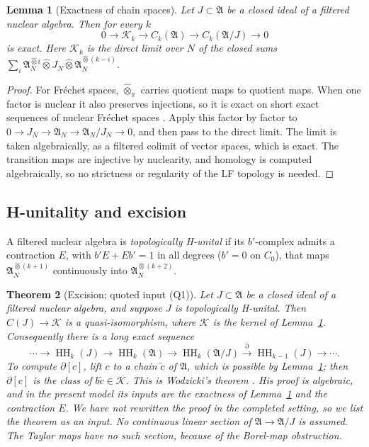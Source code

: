 \documentclass[11pt,oneside,reqno]{article}
\DeclareMathOperator{\HH}{HH}
\theoremstyle{plain}
\newtheorem{theorem}{Theorem}[section]
\newtheorem{lemma}[theorem]{Lemma}
\theoremstyle{definition}
\theoremstyle{remark}
\begin{document}
\begin{lemma}[Exactness of chain spaces]\label{lem:exactchains}
Let \(J\subset\mathfrak A\) be a closed ideal of a filtered nuclear algebra.
Then for every \(k\)
\[
 0\to\mathcal K_k\to C_k(\mathfrak A)\to C_k(\mathfrak A/J)\to0
\]
is exact. Here \(\mathcal K_k\) is the direct limit over \(N\) of the closed
sums \(\sum_i\mathfrak A_N^{\widehat\otimes i}\widehat\otimes J_N\widehat
\otimes\mathfrak A_N^{\widehat\otimes(k-i)}\).
\end{lemma}

\begin{proof}
For Fréchet spaces, \(\widehat\otimes_\pi\) carries quotient maps to quotient
maps. When one factor is nuclear it also preserves injections, so it is
exact on short exact sequences of nuclear Fréchet spaces \cite[Chs.~43,~50]
{Treves}. Apply this factor by factor to
\(0\to J_N\to\mathfrak A_N\to\mathfrak A_N/J_N\to0\), and then pass to the
direct limit. The limit is taken algebraically, as a filtered colimit of
vector spaces, which is exact. The transition maps are injective by
nuclearity, and homology is computed algebraically, so no strictness or
regularity of the LF topology is needed.
\end{proof}

\subsection{H-unitality and excision}
A filtered nuclear algebra is \emph{topologically H-unital} if its
\(b'\)-complex admits a contraction \(E\), with \(b'E+Eb'=1\) in all degrees
(\(b'=0\) on \(C_0\)), that maps \(\mathfrak A_N^{\widehat\otimes(k+1)}\)
continuously into \(\mathfrak A_N^{\widehat\otimes(k+2)}\).

\begin{theorem}[Excision; quoted input (Q1)]\label{thm:excision}
Let \(J\subset\mathfrak A\) be a closed ideal of a filtered nuclear algebra,
and suppose \(J\) is topologically H-unital. Then
\(C(J)\to\mathcal K\) is a quasi-isomorphism, where \(\mathcal K\) is the
kernel of Lemma~\ref{lem:exactchains}. Consequently there is a long exact
sequence
\[
 \cdots\to\HH_k(J)\to\HH_k(\mathfrak A)\to\HH_k(\mathfrak A/J)
 \xrightarrow{\partial}\HH_{k-1}(J)\to\cdots .
\]
To compute \(\partial[c]\), lift \(c\) to a chain \(\tilde c\) of
\(\mathfrak A\), which is possible by Lemma~\ref{lem:exactchains}; then
\(\partial[c]\) is the class of \(b\tilde c\in\mathcal K\). This is
Wodzicki's theorem \cite{Wodzicki}. His proof is algebraic, and in the
present model its inputs are the exactness of Lemma~\ref{lem:exactchains}
and the contraction \(E\). We have not rewritten the proof in the completed
setting, so we list the theorem as an input. No continuous linear section
of \(\mathfrak A\to\mathfrak A/J\) is assumed. The Taylor maps have no such
section, because of the Borel-map obstruction.
\end{theorem}
\end{document}
